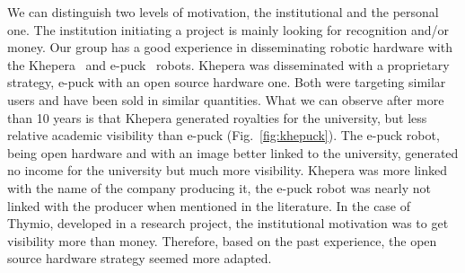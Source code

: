 \documentclass[letterpaper, 10 pt, conference]{ieeeconf}  %
\begin{document}
We can distinguish two levels of motivation, the institutional and the personal one.
The institution initiating a project is mainly looking for recognition and/or money. 
Our group has a good experience in disseminating robotic hardware with the Khepera~\cite{MonFraIen93} and e-puck~\cite{mondada2009puck} robots.
Khepera was disseminated with a proprietary strategy, e-puck with an open source hardware one.
Both were targeting similar users and have been sold in similar quantities.
What we can observe after more than 10 years is that Khepera generated royalties for the university, but less relative academic visibility than e-puck (Fig.~\ref{fig:khepuck}).
The e-puck robot, being open hardware and with an image better linked to the university, generated no income for the university but much more visibility.
Khepera was more linked with the name of the company producing it, the e-puck robot was nearly not linked with the producer when mentioned in the literature.
In the case of Thymio, developed in a research project, the institutional motivation was to get visibility more than money. 
Therefore, based on the past experience, the open source hardware strategy seemed more adapted.
\end{document}
